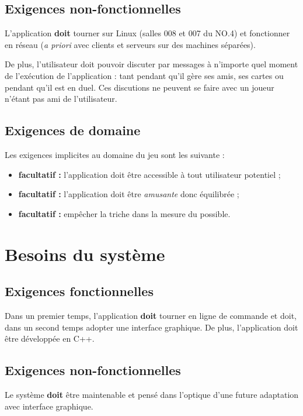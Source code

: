 \documentclass{article}
\begin{document}
    \subsection{Exigences non-fonctionnelles}
        L'application \textbf{doit} tourner sur Linux (salles 008 et 007 du NO.4) et fonctionner en réseau (\textit{a priori} avec clients
        et serveurs sur des machines séparées).

        De plus, l'utilisateur doit pouvoir discuter par messages à n'importe quel moment de l'exécution de l'application : tant pendant
        qu'il gère ses amis, ses cartes ou pendant qu'il est en \gls{duel}. Ces discutions ne peuvent se faire avec un joueur
        n'étant pas ami de l'utilisateur.

    \subsection{Exigences de domaine}
        Les exigences implicites au domaine du jeu sont les suivante :

        \begin{itemize}
            \item \textbf{\gls{facultatif} : } l'application doit être accessible à tout utilisateur potentiel ;
            \item \textbf{\gls{facultatif} : } l'application doit être \textit{amusante} donc équilibrée ;
            \item \textbf{\gls{facultatif} : } empêcher la triche dans la mesure du possible.
        \end{itemize}

\section{Besoins du système}
    \subsection{Exigences fonctionnelles}
        Dans un premier temps, l'application \textbf{doit} tourner en ligne de commande et doit, dans un second temps adopter une interface
        graphique. De plus, l'application doit être développée en C++.

    \subsection{Exigences non-fonctionnelles}
        Le système \textbf{doit} être maintenable et pensé dans l'optique d'une future adaptation avec interface graphique.
\end{document}
